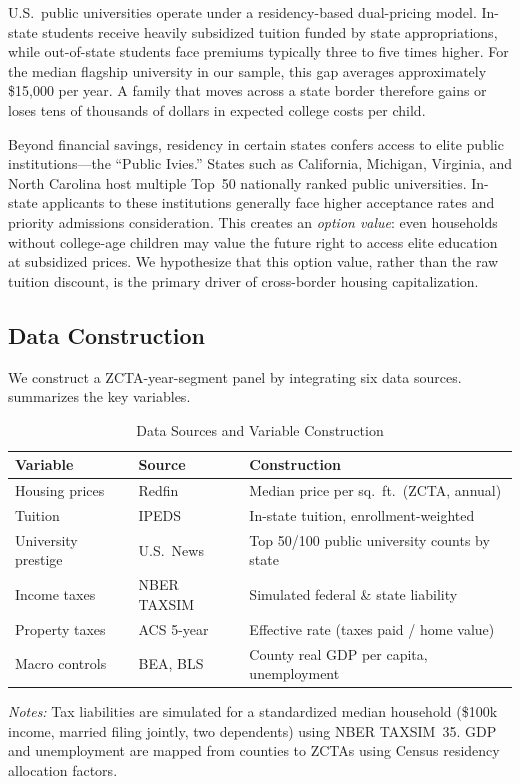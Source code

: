 \documentclass[12pt]{article}
\begin{document}
U.S.\ public universities operate under a residency-based dual-pricing model. In-state students receive heavily subsidized tuition funded by state appropriations, while out-of-state students face premiums typically three to five times higher. For the median flagship university in our sample, this gap averages approximately \$15,000 per year. A family that moves across a state border therefore gains or loses tens of thousands of dollars in expected college costs per child.

Beyond financial savings, residency in certain states confers access to elite public institutions---the ``Public Ivies.'' States such as California, Michigan, Virginia, and North Carolina host multiple Top~50 nationally ranked public universities. In-state applicants to these institutions generally face higher acceptance rates and priority admissions consideration. This creates an \textit{option value}: even households without college-age children may value the future right to access elite education at subsidized prices. We hypothesize that this option value, rather than the raw tuition discount, is the primary driver of cross-border housing capitalization.

\subsection{Data Construction}

We construct a ZCTA-year-segment panel by integrating six data sources.  summarizes the key variables.

\begin{table}[t]
\begin{threeparttable}
\caption{Data Sources and Variable Construction}\label{tab:datasources}
\begin{tabular}{lll}
\toprule
\textbf{Variable} & \textbf{Source} & \textbf{Construction} \\
\midrule
Housing prices & Redfin & Median price per sq.\ ft.\ (ZCTA, annual) \\
Tuition & IPEDS & In-state tuition, enrollment-weighted \\
University prestige & U.S.\ News & Top 50/100 public university counts by state \\
Income taxes & NBER TAXSIM & Simulated federal \& state liability \\
Property taxes & ACS 5-year & Effective rate (taxes paid / home value) \\
Macro controls & BEA, BLS & County real GDP per capita, unemployment \\
\bottomrule
\end{tabular}
\begin{tablenotes}\small
\item \textit{Notes:} Tax liabilities are simulated for a standardized median household (\$100k income, married filing jointly, two dependents) using NBER TAXSIM~35. GDP and unemployment are mapped from counties to ZCTAs using Census residency allocation factors.
\end{tablenotes}
\end{threeparttable}
\end{table}
\end{document}
